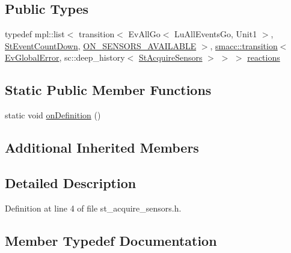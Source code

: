 \subsection*{Public Types}
\begin{DoxyCompactItemize}
\item 
typedef mpl\+::list$<$ transition$<$ Ev\+All\+Go$<$ Lu\+All\+Events\+Go, Unit1 $>$, \hyperlink{structsm__dance__bot_1_1StEventCountDown}{St\+Event\+Count\+Down}, \hyperlink{structsm__dance__bot_1_1StAcquireSensors_1_1ON__SENSORS__AVAILABLE}{O\+N\+\_\+\+S\+E\+N\+S\+O\+R\+S\+\_\+\+A\+V\+A\+I\+L\+A\+B\+LE} $>$, \hyperlink{classsmacc_1_1transition}{smacc\+::transition}$<$ \hyperlink{structsm__dance__bot_1_1EvGlobalError}{Ev\+Global\+Error}, sc\+::deep\+\_\+history$<$ \hyperlink{structsm__dance__bot_1_1StAcquireSensors}{St\+Acquire\+Sensors} $>$ $>$ $>$ \hyperlink{structsm__dance__bot_1_1StAcquireSensors_a62f6a1b5bd25352ee4ec83277112e4a8}{reactions}
\end{DoxyCompactItemize}
\subsection*{Static Public Member Functions}
\begin{DoxyCompactItemize}
\item 
static void \hyperlink{structsm__dance__bot_1_1StAcquireSensors_ae30f4b633faa922070fc8412b6dd78fc}{on\+Definition} ()
\end{DoxyCompactItemize}
\subsection*{Additional Inherited Members}


\subsection{Detailed Description}


Definition at line 4 of file st\+\_\+acquire\+\_\+sensors.\+h.



\subsection{Member Typedef Documentation}
